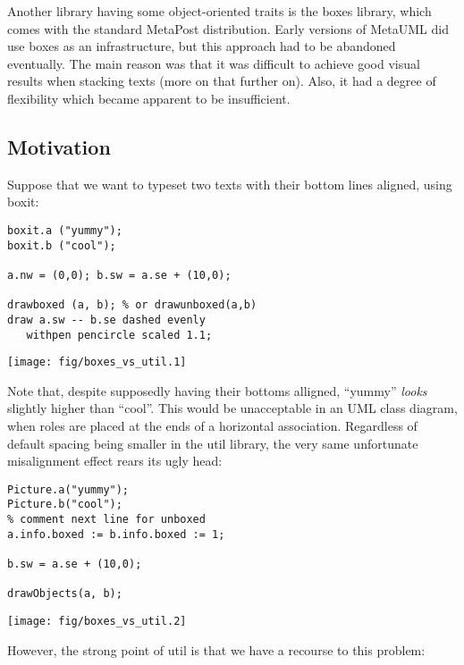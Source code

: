 \documentclass{article}
\newcommand{\code}{\ttfamily}
\begin{document}
Another library having some object-oriented traits is the {\code boxes}
library, which comes with the standard MetaPost distribution. Early versions of
MetaUML did use {\code boxes} as an infrastructure, but this approach had to be abandoned eventually.
The main reason was that it was difficult to achieve good visual results when stacking texts
(more on that further on). Also, it had a degree of flexibility which became apparent to be
insufficient.

\subsection{Motivation}

Suppose that we want to typeset two texts with their bottom lines aligned, using {\code boxit}:

\begin{multicols}{2}
\begin{verbatim}
boxit.a ("yummy");
boxit.b ("cool");

a.nw = (0,0); b.sw = a.se + (10,0);

drawboxed (a, b); % or drawunboxed(a,b)
draw a.sw -- b.se dashed evenly
   withpen pencircle scaled 1.1;
\end{verbatim}
\columnbreak
\hspace{1cm}\texttt{[image: fig/boxes\_vs\_util.1]}
\end{multicols}

Note that, despite supposedly having their bottoms alligned,
``yummy'' {\it looks} slightly higher than ``cool''. This would be unacceptable
in an UML class diagram, when roles are placed at the ends of a horizontal association.
Regardless of default spacing being smaller in the {\code util} library,
the very same unfortunate misalignment effect rears its ugly head:

\pagebreak

\begin{multicols}{2}
\begin{verbatim}
Picture.a("yummy");
Picture.b("cool");
% comment next line for unboxed
a.info.boxed := b.info.boxed := 1;

b.sw = a.se + (10,0);

drawObjects(a, b);
\end{verbatim}
\columnbreak
\hspace{1cm}\texttt{[image: fig/boxes\_vs\_util.2]}
\end{multicols}

However, the strong point of {\code util} is that we have a recourse to this problem:
\end{document}
